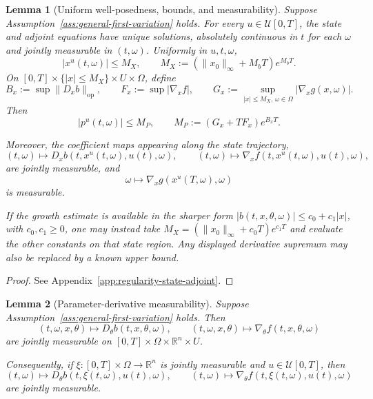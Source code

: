 \documentclass[11pt]{amsart}
\numberwithin{equation}{section} %
\newtheorem{lemma}{Lemma}[section]
\theoremstyle{remark}
\begin{document}
\begin{lemma}[Uniform well-posedness, bounds, and measurability]
\label{lem:uniform-state-adjoint-bounds}
Suppose Assumption~\ref{ass:general-first-variation} holds. For every
$u\in\mathcal U[0,T]$, the state and adjoint equations have unique
solutions, absolutely continuous in $t$ for each $\omega$ and jointly
measurable in $(t,\omega)$. Uniformly in $u,t,\omega$,
\begin{equation}
\label{eq:uniform-state-bound-general}
|x^u(t,\omega)|\le M_X,
\qquad
M_X:=(\|x_0\|_\infty+M_bT)e^{M_bT}.
\end{equation}
On $[0,T]\times\{|x|\le M_X\}\times U\times\Omega$, define
\begin{equation}
\label{eq:general-bound-constants}
B_x:=\sup\|D_x b\|_{\mathrm{op}},\qquad
F_x:=\sup|\nabla_xf|,\qquad
G_x:=\sup_{|x|\le M_X,\,\omega\in\Omega}
|\nabla_xg(x,\omega)|.
\end{equation}
Then
\begin{equation}
\label{eq:uniform-adjoint-bound-general}
|p^u(t,\omega)|\le M_P,
\qquad
M_P:=(G_x+TF_x)e^{B_xT}.
\end{equation}

Moreover, the coefficient maps appearing along the state trajectory,
\begin{equation}
\label{eq:state-adjoint-coefficient-measurability}
(t,\omega)\longmapsto
D_x b(t,x^u(t,\omega),u(t),\omega),
\qquad
(t,\omega)\longmapsto
\nabla_x f(t,x^u(t,\omega),u(t),\omega),
\end{equation}
are jointly measurable, and
\begin{equation}
\label{eq:terminal-gradient-measurability}
\omega\longmapsto
\nabla_x g(x^u(T,\omega),\omega)
\end{equation}
is measurable.

If the growth estimate is available in the sharper form
$|b(t,x,\theta,\omega)|\le c_0+c_1|x|$, with $c_0,c_1\ge0$,
one may instead take
$M_X=(\|x_0\|_\infty+c_0T)e^{c_1T}$ and evaluate the other
constants on that state region. Any displayed derivative supremum
may also be replaced by a known upper bound.
\end{lemma}

\begin{proof}
See Appendix~\ref{app:regularity-state-adjoint}.
\end{proof}

\begin{lemma}[Parameter-derivative measurability]
\label{lem:parameter-derivative-measurability}
Suppose Assumption~\ref{ass:general-first-variation} holds.
Then
\[
(t,\omega,x,\theta)\longmapsto
D_\theta b(t,x,\theta,\omega),
\qquad
(t,\omega,x,\theta)\longmapsto
\nabla_\theta f(t,x,\theta,\omega)
\]
are jointly measurable on $[0,T]\times\Omega\times\mathbb R^n\times U$.

Consequently, if
$\xi:[0,T]\times\Omega\to\mathbb R^n$
is jointly measurable and
$u\in\mathcal U[0,T]$, then
\[
(t,\omega)\longmapsto
D_\theta b(t,\xi(t,\omega),u(t),\omega),
\qquad
(t,\omega)\longmapsto
\nabla_\theta f(t,\xi(t,\omega),u(t),\omega)
\]
are jointly measurable.
\end{lemma}
\end{document}
